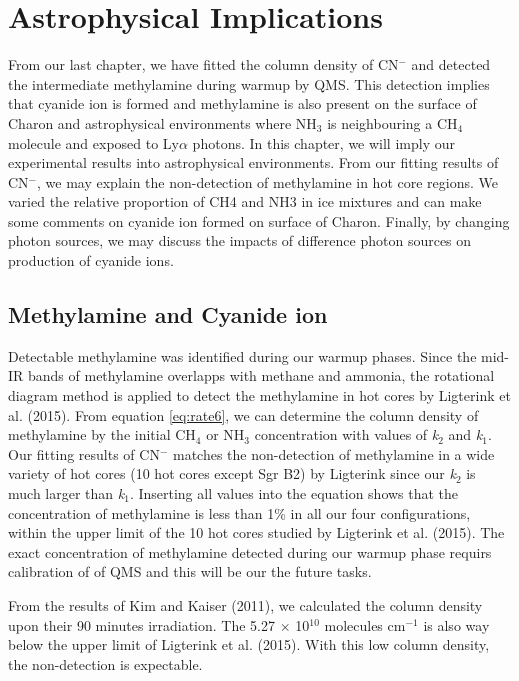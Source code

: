 \chapter{\protect Astrophysical Implications}
\label{astron}

From our last chapter, we have fitted the column density of CN$^-$ and detected the intermediate methylamine during warmup by QMS. This detection implies that cyanide ion is formed and methylamine is also present on the surface of Charon and astrophysical environments where NH$_3$ is neighbouring a CH$_4$ molecule and exposed to Ly$\alpha$ photons. In this chapter, we will imply our experimental results into astrophysical environments. From our fitting results of CN$^-$, we may explain the non-detection of methylamine in hot core regions. We varied the relative proportion of CH4 and NH3 in ice mixtures and can make some comments on cyanide ion formed on surface of Charon. Finally, by changing photon sources, we may discuss the impacts of difference photon sources on production of cyanide ions.

\section {Methylamine and Cyanide ion}

Detectable methylamine was identified during our warmup phases. Since the mid-IR bands of methylamine overlapps with methane and ammonia, the rotational diagram method is applied to detect the methylamine in hot cores by Ligterink et al. (2015)\cite{ligterink2015search}. From equation \ref{eq:rate6}, we can determine the column density of methylamine by the initial CH$_4$ or NH$_3$ concentration with values of \textit{k$_2$} and \textit{k$_1$}. Our fitting results of CN$^-$ matches the non-detection of methylamine in a wide variety of hot cores (10 hot cores except Sgr B2) by Ligterink since our \textit{k$_2$} is much larger than \textit{k$_1$}. Inserting all values into the equation shows that the concentration of methylamine is less than 1\% in all our four configurations, within the upper limit of the 10 hot cores studied by Ligterink et al. (2015)\cite{ligterink2015search}. The exact concentration of methylamine detected during our warmup phase requirs calibration of of QMS and this will be our the future tasks.

From the results of Kim and Kaiser (2011)\cite{kim}, we calculated the column density upon their 90 minutes irradiation. The 5.27 $\times$ 10$^{10}$ molecules cm$^{-1}$ is also way below the upper limit of Ligterink et al. (2015)\cite{ligterink2015search}. With this low column density, the non-detection is expectable.

